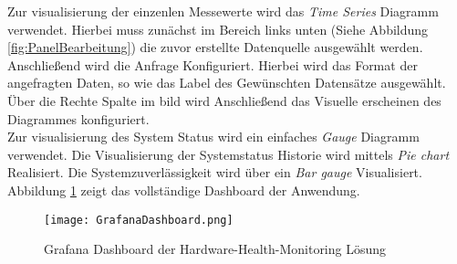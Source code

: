 \vspace{-1.8cm}
Zur visualisierung der einzenlen Messewerte wird das \textit{Time Series} Diagramm verwendet. Hierbei muss zunächst im Bereich links unten (Siehe Abbildung \ref{fig:PanelBearbeitung}) die zuvor erstellte Datenquelle ausgewählt werden. Anschließend wird die Anfrage Konfiguriert. Hierbei wird das Format der angefragten Daten, so wie das Label des Gewünschten Datensätze ausgewählt. Über die Rechte Spalte im bild wird Anschließend das Visuelle erscheinen des Diagrammes konfiguriert.\\
Zur visualisierung des System Status wird ein einfaches \textit{Gauge} Diagramm verwendet. Die Visualisierung der Systemstatus Historie wird mittels \textit{Pie chart} Realisiert. Die Systemzuverlässigkeit wird über ein \textit{Bar gauge} Visualisiert.\\
Abbildung \ref{fig:Grafa} zeigt das vollständige Dashboard der Anwendung.
\vspace{-2cm}
\begin{center}
    \begin{figure}[h!]
        \centering
        \texttt{[image: GrafanaDashboard.png]}
        \caption{Grafana Dashboard der Hardware-Health-Monitoring Lösung}
        \label{fig:Grafa}
    \end{figure}
\end{center}